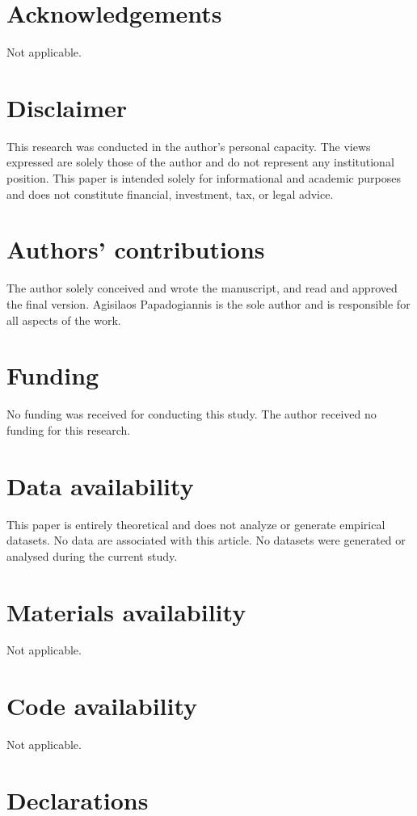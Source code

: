 \documentclass[11pt]{article}
\begin{document}
\section*{Acknowledgements}
Not applicable.

\section*{Disclaimer}
This research was conducted in the author's personal capacity. The views expressed are solely those of the author and do not represent any institutional position. This paper is intended solely for informational and academic purposes and does not constitute financial, investment, tax, or legal advice.

\section*{Authors' contributions}
The author solely conceived and wrote the manuscript, and read and approved the final version. Agisilaos Papadogiannis is the sole author and is responsible for all aspects of the work.

\section*{Funding}
No funding was received for conducting this study. The author received no funding for this research.

\section*{Data availability}
This paper is entirely theoretical and does not analyze or generate empirical datasets. No data are associated with this article. No datasets were generated or analysed during the current study.

\section*{Materials availability}
Not applicable.

\section*{Code availability}
Not applicable.

\section*{Declarations}
\end{document}
